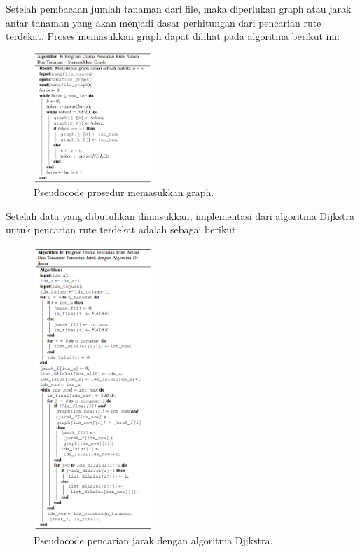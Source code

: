 \documentclass[conference]{IEEEtran}
\begin{document}
    Setelah pembacaan jumlah tanaman dari file, maka diperlukan graph atau jarak antar tanaman yang akan menjadi dasar
    perhitungan dari pencarian rute terdekat. Proses memasukkan
    graph dapat dilihat pada algoritma berikut ini:

    \begin{figure}[htbp]
        \centerline{\includegraphics[width=0.4\textwidth]{./sources/masukkanGraph.png}}
        \caption{Pseudocode prosedur memasukkan graph.}
        \label{fig6}
    \end{figure}  

    Setelah data yang dibutuhkan dimasukkan, implementasi
    dari algoritma Dijkstra untuk pencarian rute terdekat adalah
    sebagai berikut:
    
    \begin{figure}[htbp]
        \centerline{\includegraphics[width=0.4\textwidth]{./sources/cariJarak.png}}
        \caption{Pseudocode pencarian jarak dengan algoritma Djikstra.}
        \label{fig7}
    \end{figure} 
\end{document}
